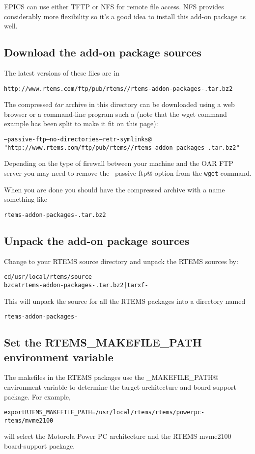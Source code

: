 \documentclass{report}
\begin{document}
EPICS can use either TFTP or NFS for remote file access.
NFS provides considerably more flexibility so it's a good
idea to install this add-on package as well.

\subsection{Download the add-on package sources}
The latest versions of these files are in
\begin{alltt}
http://www.rtems.com/ftp/pub/rtems/\rtemsVersion/rtems-addon-packages-\rtemsVersion.tar.bz2
\end{alltt}

The compressed {\it tar} archive in this directory can be downloaded using a web browser or a command-line program such a \verb@wget@ (note that the
wget command example has been split to make it fit on this page):
{\small
\begin{alltt}
\verb@wget --passive-ftp --no-directories --retr-symlinks@
\hspace{0.3in}"http://www.rtems.com/ftp/pub/rtems/\rtemsVersion/rtems-addon-packages-\rtemsVersion.tar.bz2"
\end{alltt}
}
Depending on the type of firewall between your machine and the OAR FTP server
you may need to remove the \verb@--passive-ftp@ option from the {\tt wget} command.


When you are done you should have the compressed archive with a name something like
\begin{alltt}
rtems-addon-packages-\rtemsVersion.tar.bz2
\end{alltt}

\subsection{Unpack the add-on package sources}
Change to your RTEMS source directory and unpack the RTEMS sources by:
\begin{alltt}
cd /usr/local/rtems/source
bzcat rtems-addon-packages-\rtemsVersion.tar.bz2 | tar xf -
\end{alltt}
This will unpack the source for all the RTEMS packages into a directory named
\begin{alltt}
rtems-addon-packages-\rtemsVersion
\end{alltt}


\subsection{Set the RTEMS\_MAKEFILE\_PATH environment variable}
The makefiles in the RTEMS packages use the \verb@RTEMS_MAKEFILE_PATH@ environment variable to determine the
target architecture and board-support package.  For example,
\begin{alltt}
export RTEMS_MAKEFILE_PATH=/usr/local/rtems/rtems\rtemsVersion/powerpc-rtems\rtemsVersion/mvme2100
\end{alltt}
will select the Motorola Power PC architecture and the RTEMS mvme2100 board-support package.
\end{document}
